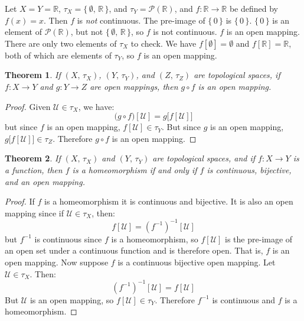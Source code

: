 \documentclass{article}
\theoremstyle{plain}
\newtheorem{theorem}{Theorem}[section]
\theoremstyle{normal}
\newenvironment{example}{%
    \pushQED{\qed}\renewcommand{\qedsymbol}{$\blacksquare$}\examplex%
}{%
    \popQED\endexamplex%
}
\begin{document}
        \begin{example}
            Let $X=Y=\mathbb{R}$, $\tau_{X}=\{\,\emptyset,\,\mathbb{R}\,\}$, and
            $\tau_{Y}=\mathcal{P}(\mathbb{R})$, and
            $f:\mathbb{R}\rightarrow\mathbb{R}$ be defined by $f(x)=x$. Then
            $f$ is \textit{not} continuous. The pre-image of $\{\,0\,\}$ is
            $\{\,0\,\}$. $\{\,0\,\}$ is an element of $\mathcal{P}(\mathbb{R})$,
            but not $\{\,\emptyset,\,\mathbb{R}\,\}$, so $f$ is not continuous.
            $f$ is an open mapping. There are only two elements of $\tau_{X}$
            to check. We have $f[\emptyset]=\emptyset$ and
            $f[\mathbb{R}]=\mathbb{R}$, both of which are elements of
            $\tau_{Y}$, so $f$ is an open mapping.
        \end{example}
        \begin{theorem}
            If $(X,\,\tau_{X})$, $(Y,\,\tau_{Y})$, and $(Z,\,\tau_{Z})$ are
            topological spaces, if $f:X\rightarrow{Y}$ and $g:Y\rightarrow{Z}$
            are open mappings, then $g\circ{f}$ is an open mapping.
        \end{theorem}
        \begin{proof}
            Given $\mathcal{U}\in\tau_{X}$, we have:
            \begin{equation}
                \big(g\circ{f}\big)[\mathcal{U}]
                =g\big[f[\mathcal{U}]\big]
            \end{equation}
            but since $f$ is an open mapping, $f[\mathcal{U}]\in\tau_{Y}$. But
            since $g$ is an open mapping,
            $g\big[f[\mathcal{U}]\big]\in\tau_{Z}$. Therefore $g\circ{f}$ is an
            open mapping.
        \end{proof}
        \begin{theorem}
            If $(X,\,\tau_{X})$ and $(Y,\,\tau_{Y})$ are topological spaces, and
            if $f:X\rightarrow{Y}$ is a function, then $f$ is a homeomorphism
            if and only if $f$ is continuous, bijective, and an open mapping.
        \end{theorem}
        \begin{proof}
            If $f$ is a homeomorphism it is continuous and bijective. It is
            also an open mapping since if $\mathcal{U}\in\tau_{X}$, then:
            \begin{equation}
                f[\mathcal{U}]
                =(f^{-1})^{-1}[\mathcal{U}]
            \end{equation}
            but $f^{-1}$ is continuous since $f$ is a homeomorphism, so
            $f[\mathcal{U}]$ is the pre-image of an open set under a continuous
            function and is therefore open. That is, $f$ is an open mapping.
            Now suppose $f$ is a continuous bijective open mapping. Let
            $\mathcal{U}\in\tau_{X}$. Then:
            \begin{equation}
                (f^{-1})^{-1}[\mathcal{U}]=f[\mathcal{U}]
            \end{equation}
            But $\mathcal{U}$ is an open mapping, so
            $f[\mathcal{U}]\in\tau_{Y}$. Therefore $f^{-1}$ is continuous and
            $f$ is a homeomorphism.
        \end{proof}
\end{document}
